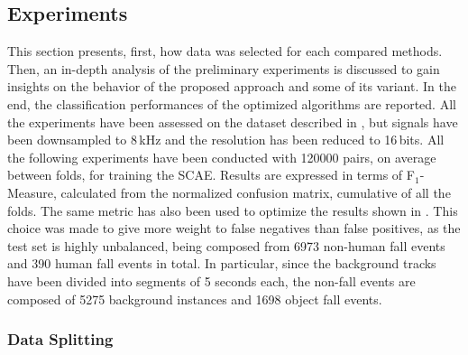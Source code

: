 \subsection{Experiments}
This section presents, first, how data was selected for each compared methods. Then, an in-depth analysis of the preliminary experiments is discussed to gain insights on the behavior of the proposed approach and some of its variant. In the end, the classification performances of the optimized algorithms are reported. 
All the experiments have been assessed on the dataset described in , but signals have been downsampled to 8\,kHz and the resolution has been reduced to 16\,bits.
All the following experiments have been conducted with 120000 pairs, on average between folds, for training the SCAE. Results are expressed in terms of F$_1$-Measure, calculated from the normalized confusion matrix, cumulative of all the folds. The same metric has also been used to optimize the results shown in . This choice was made to give more weight to false negatives than false positives, as the test set is highly unbalanced, being composed from 6973 non-human fall events and 390 human fall events in total. In particular, since the background tracks have been divided into segments of 5 seconds each, the non-fall events are composed of 5275 background instances and 1698 object fall events.

\subsubsection{Data Splitting}

